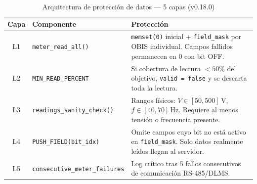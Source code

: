 \begin{table}[htbp]
\centering
\caption{Arquitectura de protección de datos --- 5 capas (v0.18.0)}
\label{tab:protection_layers_v018}
\begin{tabular}{@{}clp{8cm}@{}}
\toprule
\textbf{Capa} & \textbf{Componente} & \textbf{Protección} \\
\midrule
L1 & \texttt{meter\_read\_all()} & \texttt{memset(0)} inicial + \texttt{field\_mask} por OBIS individual. Campos fallidos permanecen en 0 con bit OFF. \\
\addlinespace
L2 & \texttt{MIN\_READ\_PERCENT} & Si cobertura de lectura $<50\%$ del objetivo, \texttt{valid = false} y se descarta toda la lectura. \\
\addlinespace
L3 & \texttt{readings\_sanity\_check()} & Rangos físicos: $V \in [50, 500]$\,V, $f \in [40, 70]$\,Hz. Requiere al menos tensión o frecuencia presente. \\
\addlinespace
L4 & \texttt{PUSH\_FIELD(bit\_idx)} & Omite campos cuyo bit no está activo en \texttt{field\_mask}. Solo datos realmente leídos llegan al servidor. \\
\addlinespace
L5 & \texttt{consecutive\_meter\_failures} & Log crítico tras 5 fallos consecutivos de comunicación RS-485/DLMS. \\
\bottomrule
\end{tabular}
\end{table}
